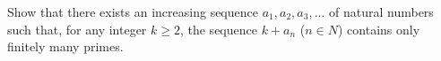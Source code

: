 Show that there exists an increasing sequence $a_1,a_2,a_3,...$ of natural numbers such that, for any integer $k \ge 2$, the sequence $k+a_n$ ($n \in N$) contains only finitely many primes.